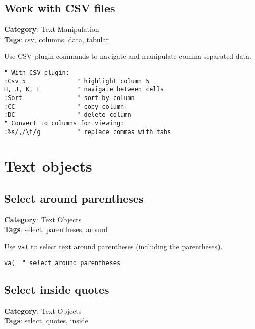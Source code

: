 {{{{{{{{{{{{{{{\section{Work with CSV files}

\textbf{Category}: Text Manipulation\\ \textbf{Tags}: csv, columns, data, tabular
\vspace{0.5cm}

Use CSV plugin commands to navigate and manipulate comma-separated data.

\begin{Exa*}{}
\begin{Verbatim}[fontsize=\footnotesize, breaklines, breakanywhere]
" With CSV plugin:
:Csv 5              " highlight column 5
H, J, K, L          " navigate between cells
:Sort               " sort by column
:CC                 " copy column
:DC                 " delete column
" Convert to columns for viewing:
:%s/,/\t/g          " replace commas with tabs
\end{Verbatim}
\end{Exa*}

\chapter{Text objects}
\section{Select around parentheses}

\textbf{Category}: Text Objects\\ \textbf{Tags}: select, parentheses, around
\vspace{0.5cm}

Use {\footnotesize \Verb§va(§} to select text around parentheses (including the parentheses).

\begin{Exa*}{}
\begin{Verbatim}[fontsize=\footnotesize, breaklines, breakanywhere]
va(  " select around parentheses
\end{Verbatim}
\end{Exa*}

\section{Select inside quotes}

\textbf{Category}: Text Objects\\ \textbf{Tags}: select, quotes, inside
\vspace{0.5cm}

}}}}}}}}}}}}}}}

